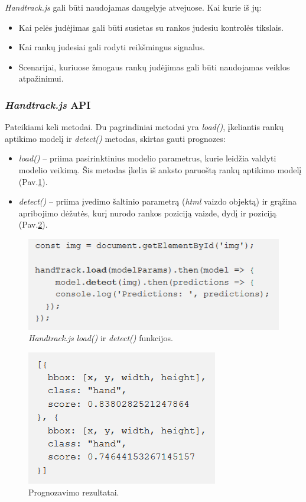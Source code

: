 \documentclass{VUMIFInfKursinis}
\begin{document}
\textit{Handtrack.js} gali būti naudojamas daugelyje atvejuose. Kai kurie iš jų\cite{11}:

\begin{itemize}
  \item Kai pelės judėjimas gali būti susietas su rankos judesiu kontrolės tikslais.
  \item Kai rankų judesiai gali rodyti reikšmingus signalus.
  \item Scenarijai, kuriuose žmogaus rankų judėjimas gali būti naudojamas veiklos atpažinimui.
\end{itemize}

\subsubsection{\textit{Handtrack.js} API}

Pateikiami keli metodai. Du pagrindiniai metodai yra  \textit{load()}, įkeliantis rankų aptikimo modelį ir \textit{detect()} metodas, skirtas gauti prognozes\cite{11}:

\begin{itemize}
  \item \textit{load()} -- priima pasirinktinius modelio parametrus, kurie leidžia valdyti modelio veikimą. Šis metodas įkelia iš anksto paruoštą rankų aptikimo modelį (Pav.\ref{fig:handtrack1}).
  \item \textit{detect()} -- priima įvedimo šaltinio parametrą (\textit{html} vaizdo objektą) ir grąžina apribojimo dėžutės, kurį nurodo rankos poziciją vaizde, dydį ir poziciją (Pav.\ref{fig:handtrack2}).
\end{itemize}

\begin{figure}[h!]
\centering
  \includegraphics[scale=0.9]{img/handtrack1.PNG}
  \caption{\textit{Handtrack.js} \textit{load()} ir \textit{detect()} funkcijos.}
  \label{fig:handtrack1}
\end{figure}

\begin{figure}[h!]
\centering
  \includegraphics[scale=0.9]{img/handtrack2.PNG}
  \caption{Prognozavimo rezultatai.}
  \label{fig:handtrack2}
\end{figure}
\end{document}
